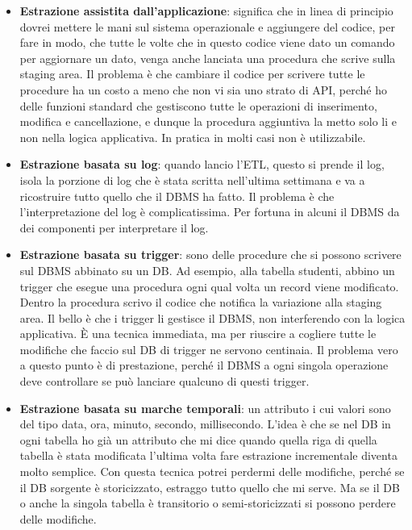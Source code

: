 \begin{itemize}
	\item 
	\textbf{Estrazione assistita dall’applicazione}: significa che in linea di principio dovrei mettere le mani sul sistema operazionale e aggiungere del codice, per fare in modo, che tutte le volte che in questo codice viene dato un comando per aggiornare un dato, venga anche lanciata una procedura che scrive sulla staging area. Il problema è che cambiare il codice per scrivere tutte le procedure ha un costo a meno che non vi sia uno strato di API, perché ho delle funzioni standard che gestiscono tutte le operazioni di inserimento, modifica e cancellazione, e dunque la procedura aggiuntiva la metto solo li e non nella logica applicativa. In pratica in molti casi non è utilizzabile. 
	\item 
	\textbf{Estrazione basata su log}: quando lancio l’ETL, questo si prende il log, isola la porzione di log che è stata scritta nell’ultima settimana e va a ricostruire tutto quello che il DBMS ha fatto. Il problema è che l’interpretazione del log è complicatissima. Per fortuna in alcuni il DBMS da dei componenti per interpretare il log.
	\item 
	\textbf{Estrazione basata su trigger}: sono delle procedure che si possono scrivere sul DBMS abbinato su un DB. Ad esempio, alla tabella studenti, abbino un trigger che esegue una procedura ogni qual volta un record viene modificato. Dentro la procedura scrivo il codice che notifica la variazione alla staging area. Il bello è che i trigger li gestisce il DBMS, non interferendo con la logica applicativa. È una tecnica immediata, ma per riuscire a cogliere tutte le modifiche che faccio sul DB di trigger ne servono centinaia. Il problema vero a questo punto è di prestazione, perché il DBMS a ogni singola operazione deve controllare se può lanciare qualcuno di questi trigger.
	\item 
	\textbf{Estrazione basata su marche temporali}: un attributo i cui valori sono del tipo data, ora, minuto, secondo, millisecondo. L’idea è che se nel DB in ogni tabella ho già un attributo che mi dice quando quella riga di quella tabella è stata modificata l’ultima volta fare estrazione incrementale diventa molto semplice. Con questa tecnica potrei perdermi delle modifiche, perché se il DB sorgente è storicizzato, estraggo tutto quello che mi serve. Ma se il DB o anche la singola tabella è transitorio o semi-storicizzati si possono perdere delle modifiche. 
\end{itemize}

